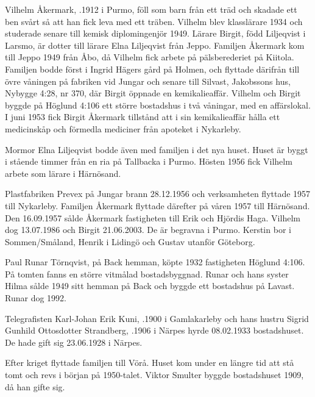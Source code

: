 Vilhelm Åkermark, .1912 i Purmo, föll som barn från ett träd och skadade ett ben svårt så att han fick leva med ett träben. Vilhelm blev klasslärare 1934 och studerade senare till kemisk diplomingenjör 1949. Lärare Birgit, född Liljeqvist i Larsmo, är dotter till lärare Elna Liljeqvist från Jeppo. Familjen Åkermark kom till Jeppo 1949 från Åbo, då Vilhelm	fick arbete på pälsberederiet på Kiitola. Familjen bodde först i Ingrid Hägers gård på Holmen, och flyttade därifrån till övre våningen på fabriken vid Jungar och senare till Silvast, Jakobssons hus, Nybygge 4:28, nr 370, där Birgit öppnade en kemikalieaffär. Vilhelm och Birgit byggde på Höglund 4:106 ett större bostadshus i två våningar, med en 	affärslokal. I juni 1953 fick Birgit Åkermark tillstånd att i sin kemikalieaffär hålla ett medicinskåp och förmedla mediciner från apoteket i Nykarleby.
\begin{jhchildren}
  \item {}
  \item {}
  \item {}
\end{jhchildren}
Mormor Elna Liljeqvist bodde även med familjen i det nya huset. Huset är byggt i stående timmer från en ria på Tallbacka i Purmo. Hösten 1956 fick Vilhelm arbete som lärare i Härnösand.

Plastfabriken Prevex på Jungar brann 28.12.1956 och verksamheten flyttade 1957 till Nykarleby. Familjen Åkermark flyttade därefter på våren 1957 till Härnösand. Den 16.09.1957 sålde Åkermark fastigheten till Erik och Hjördis Haga. Vilhelm dog 13.07.1986 och Birgit 21.06.2003. De är begravna i Purmo. Kerstin bor i Sommen/Småland, Henrik i Lidingö och Gustav utanför Göteborg.


Paul Runar Törnqvist,  på Back hemman, köpte 1932 fastigheten Höglund 4:106. På tomten fanns en större vitmålad bostadsbyggnad. Runar och hans syster Hilma sålde 1949 sitt hemman på Back och byggde ett bostadshus på Lavast. Runar dog 1992.

Telegrafisten Karl-Johan Erik Kuni, .1900 i Gamlakarleby och hans hustru Sigrid Gunhild Ottosdotter Strandberg, .1906 i Närpes hyrde 08.02.1933 bostadshuset. De hade gift sig 23.06.1928 i Närpes.
\begin{jhchildren}
  \item {}
  \item {}
\end{jhchildren}
Efter kriget flyttade familjen till Vörå. Huset kom under en längre tid	att stå tomt och revs i början på 1950-talet. Viktor Smulter byggde	bostadshuset 1909, då han gifte sig.


